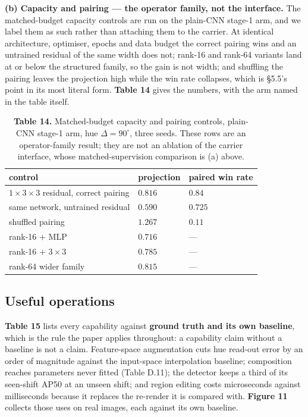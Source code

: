 \textbf{(b) Capacity and pairing --- the operator family, not the interface.} The matched-budget capacity controls are run on the plain-CNN stage-1 arm, and we label them as such rather than attaching them to the carrier. At identical architecture, optimiser, epochs and data budget the correct pairing wins and an untrained residual of the same width does not; rank-16 and rank-64 variants land at or below the structured family, so the gain is not width; and shuffling the pairing leaves the projection high while the win rate collapses, which is \S{}5.5's point in its most literal form. \textbf{Table 14} gives the numbers, with the arm named in the table itself.


\begin{table}[t]
\centering
\small
\caption*{\textbf{Table 14.} Matched-budget capacity and pairing controls, plain-CNN stage-1 arm, hue $\Delta=90^\circ$, three seeds. These rows are an operator-family result; they are not an ablation of the carrier interface, whose matched-supervision comparison is (a) above.}
\begin{tabularx}{\textwidth}{@{}>{\raggedright\arraybackslash}X >{\raggedright\arraybackslash}X >{\raggedright\arraybackslash}X@{}}
\toprule
\textbf{control} & \textbf{projection} & \textbf{paired win rate} \\
\midrule
$1\times3\times3$ residual, correct pairing & $0.816$ & $0.84$ \\
same network, untrained residual & $0.590$ & $0.725$ \\
shuffled pairing & $1.267$ & $0.11$ \\
rank-16 $+$ MLP & $0.716$ & --- \\
rank-16 $+$ $3\times3$ & $0.785$ & --- \\
rank-64 wider family & $0.815$ & --- \\
\bottomrule
\end{tabularx}
\end{table}

\subsection{Useful operations}

\textbf{Table 15} lists every capability against \textbf{ground truth and its own baseline}, which is the rule the paper applies throughout: a capability claim without a baseline is not a claim. Feature-space augmentation cuts hue read-out error by an order of magnitude against the input-space interpolation baseline; composition reaches parameters never fitted (Table D.11); the detector keeps a third of its seen-shift AP50 at an unseen shift; and region editing costs microseconds against milliseconds because it replaces the re-render it is compared with. \textbf{Figure 11} collects those uses on real images, each against its own baseline.

